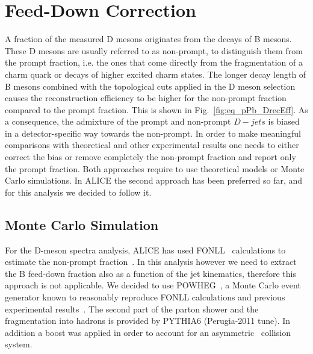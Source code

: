 \section{Feed-Down Correction}
\label{sec:FD}

A fraction of the measured D mesons originates from the decays of B mesons. These D mesons are usually referred to as non-prompt,
to distinguish them from the prompt fraction, i.e. the ones that come directly from the fragmentation of a charm quark or decays of higher excited charm states.
The longer decay length of B mesons combined with the topological cuts applied in the D meson selection causes the reconstruction efficiency 
to be higher for the non-prompt fraction compared to the prompt fraction. This is shown in Fig.~\ref{fig:eq_pPb_DrecEff}.
As a consequence, the admixture of the prompt and non-prompt $D-jets$ is biased in a detector-specific way towards the non-prompt.
In order to make meaningful comparisons with theoretical and other experimental results one needs to either correct the bias or remove completely the non-prompt fraction and report only the prompt fraction. 
Both approaches require to use theoretical models or Monte Carlo simulations.
In ALICE the second approach has been preferred so far, and for this analysis we decided to follow it.

\subsection{Monte Carlo Simulation}

For the D-meson spectra analysis, ALICE has used FONLL~\cite{Cacciari:1998} calculations to estimate the non-prompt fraction~\cite{ALICE:2012d, ALICE:2014d, ALICE:2016a}.
In this analysis however we need to extract the B feed-down fraction also as a function of the jet kinematics, therefore this approach is not applicable.
We decided to use POWHEG~\cite{Alioli:2010}, a Monte Carlo event generator known to reasonably reproduce FONLL calculations and previous experimental results~\cite{Cacciari:2012b}.
The second part of the parton shower and the fragmentation into hadrons is provided by PYTHIA6 (Perugia-2011 tune). In addition a boost was applied in order to account for an asymmetric \pPb\ collision system. 



